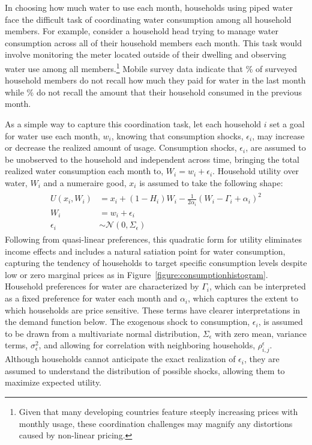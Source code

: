 \documentclass[12pt]{article}
\begin{document}

In choosing how much water to use each month, households using piped water face the difficult task of coordinating water consumption among all household members.  For example, consider a household head trying to manage water consumption across all of their household members each month.  This task would involve monitoring the meter located outside of their dwelling and observing water use among all members.\footnote{Given that many developing countries feature steeply increasing prices with monthly usage, these coordination challenges may magnify any distortions caused by non-linear pricing.}  Mobile survey data indicate that \unskip\% of surveyed household members do not recall how much they paid for water in the last month while \unskip\% do not recall the amount that their household consumed in the previous month.  

As a simple way to capture this coordination task, let each household $i$ set a goal for water use each month, $w_i$, knowing that consumption shocks, $\epsilon_i$, may increase or decrease the realized amount of usage.  Consumption shocks, $\epsilon_i$, are assumed to be unobserved to the household and independent across time, bringing the total realized water consumption each month to, $W_i=w_i+\epsilon_i$.  Household utility over water, $W_i$ and a numeraire good, $x_i$ is assumed to take the following shape:
\begin{align}\label{equation:umaxfirst}
\begin{split}
U(x_i,W_i) &=  x_i + (1-H_i) W_i - \frac{1}{2\alpha_i } ( W_i - \Gamma_i + \alpha_i )^2  \\
W_i &= w_i + \epsilon_i \\
\epsilon_i &\sim \mathcal{N}(0,\Sigma_{\epsilon})
\end{split}
\end{align}
Following from quasi-linear preferences, this quadratic form for utility eliminates income effects and includes a natural satiation point for water consumption, capturing the tendency of households to target specific consumption levels despite low or zero marginal prices as in Figure~\ref{figure:consumptionhistogram}.  Household preferences for water are characterized by $\Gamma_i$, which can be interpreted as a fixed preference for water each month and $\alpha_i$, which captures the extent to which households are price sensitive.  These terms have clearer interpretations in the demand function below.  The exogenous shock to consumption, $\epsilon_i$, is assumed to be drawn from a multivariate normal distribution, $\Sigma_{\epsilon}$ with zero mean, variance terms, $\sigma_{\epsilon}^2$, and allowing for correlation with neighboring households, ${\rho}^{\epsilon}_{i,j}$.  Although households cannot anticipate the exact realization of $\epsilon_i$, they are assumed to understand the distribution of possible shocks, allowing them to maximize expected utility.
\end{document}

